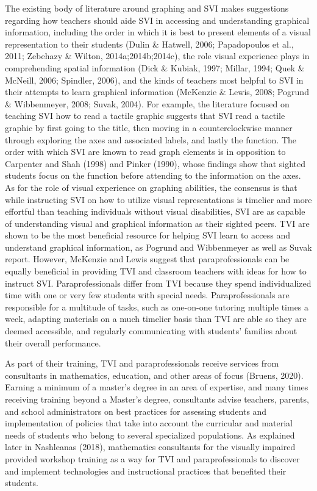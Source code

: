 \documentclass[11.5pt]{sig-alternate} %
\begin{document}
\begin{large}
The existing body of literature around graphing and SVI makes suggestions regarding how teachers should aide SVI in accessing and understanding graphical information, including the order in which it is best to present elements of a visual representation to their students (Dulin \& Hatwell, 2006; Papadopoulos et al., 2011; Zebehazy \& Wilton, 2014a;2014b;2014c), the role visual experience plays in comprehending spatial information (Dick \& Kubiak, 1997; Millar, 1994; Quek \& McNeill, 2006; Spindler, 2006), and the kinds of teachers most helpful to SVI in their attempts to learn graphical information (McKenzie \& Lewis, 2008; Pogrund \& Wibbenmeyer, 2008; Suvak, 2004). For example, the literature focused on teaching SVI how to read a tactile graphic suggests that SVI read a tactile graphic by first going to the title, then moving in a counterclockwise manner through exploring the axes and associated labels, and lastly the function. The order with which SVI are known to read graph elements is in opposition to Carpenter and Shah (1998) and Pinker (1990), whose findings show that sighted students focus on the function before attending to the information on the axes. As for the role of visual experience on graphing abilities, the consensus is that while instructing SVI on how to utilize visual representations is timelier and more effortful than teaching individuals without visual disabilities, SVI are as capable of understanding visual and graphical information as their sighted peers. TVI are shown to be the most beneficial resource for helping SVI learn to access and understand graphical information, as Pogrund and Wibbenmeyer as well as Suvak report. However, McKenzie and Lewis suggest that paraprofessionals can be equally beneficial in providing TVI and classroom teachers with ideas for how to instruct SVI. Paraprofessionals differ from TVI because they spend individualized time with one or very few students with special needs. Paraprofessionals are responsible for a multitude of tasks, such as one-on-one tutoring multiple times a week, adapting materials on a much timelier basis than TVI are able so they are deemed accessible, and regularly communicating with students’ families about their overall performance.
 
As part of their training, TVI and paraprofessionals receive services from consultants in mathematics, education, and other areas of focus (Bruens, 2020). Earning a minimum of a master’s degree in an area of expertise, and many times receiving training beyond a Master’s degree, consultants advise teachers, parents, and school administrators on best practices for assessing students and implementation of policies that take into account the curricular and material needs of students who belong to several specialized populations. As explained later in Nashleanas (2018), mathematics consultants for the visually impaired provided workshop training as a way for TVI and paraprofessionals to discover and implement technologies and instructional practices that benefited their students.


\end{large}
\end{document}
